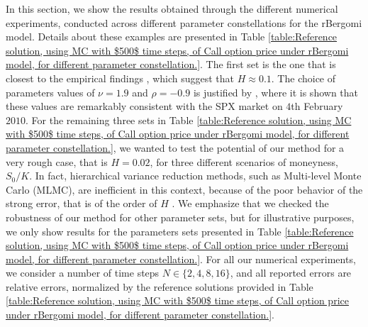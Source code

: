 In this section, we show the results obtained through the different numerical experiments,  conducted across different parameter constellations for the rBergomi model. Details about these examples are presented in Table \ref{table:Reference solution, using MC with $500$ time steps, of Call option price under rBergomi model, for different parameter constellation.}. The first set is the one that is closest to the empirical findings \cite{bennedsen2016decoupling,gatheral2018volatility}, which suggest that $H \approx 0.1$. The choice of parameters values of $\nu= 1.9$ and $\rho=-0.9$ is justified by \cite{bayer2016pricing}, where it is shown that these values are remarkably consistent with the SPX market on $4$th February $2010$. For the remaining three sets in Table \ref{table:Reference solution, using MC with $500$ time steps, of Call option price under rBergomi model, for different parameter constellation.}, we wanted to test the potential of our method for a very rough case, that is $H=0.02$, for three different  scenarios  of moneyness, $S_0/K$. In fact, hierarchical variance reduction methods, such as Multi-level Monte Carlo (MLMC), are inefficient in this context, because of the poor behavior of the strong error, that is of the order of $H$ \cite{neuenkirch2016order}. We emphasize that we checked the robustness of our method for other parameter sets, but for illustrative purposes, we only show results for the parameters sets presented in Table \ref{table:Reference solution, using MC with $500$ time steps, of Call option price under rBergomi model, for different parameter constellation.}. For all our numerical experiments, we consider   a number of time steps $N \in \{2,4,8,16\}$, and  all reported errors are relative errors, normalized by the reference solutions provided in Table \ref{table:Reference solution, using MC with $500$ time steps, of Call option price under rBergomi model, for different parameter constellation.}.

